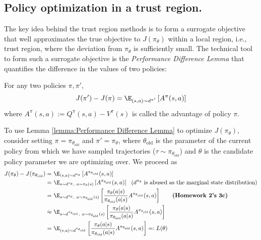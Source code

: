 \subsection{Policy optimization in a trust region.}
The key idea behind the trust region methods is to form a surrogate objective that well approximates the true objective to $J(\pi_\theta)$ within a local region, i.e., trust region, where the deviation from $\pi_\theta$ is sufficiently small.
The technical tool to form such a surrogate objective is the {\em Performance Difference Lemma} that quantifies the difference in the values of two policies:
\begin{lemma}
\label{lemma:Performance Difference Lemma}
For any two policies $\pi, \pi'$,
\begin{align*}
    J(\pi') - J(\pi) = \E_{{(s,a)}\sim d^{\pi'}}\left[A^\pi(s,a)\right]
\end{align*}
where $A^\pi(s,a):= Q^\pi(s,a)-V^\pi(s)$ is called the advantage of policy $\pi$.
\end{lemma}
To use Lemma \ref{lemma:Performance Difference Lemma} to optimize $J(\pi_\theta)$, consider setting $\pi=\pi_{\theta_{\text{old}}}$ and $\pi'=\pi_\theta$,
where $\theta_{\text{old}}$ is the parameter of the current policy from which we have sampled trajectories ($\tau\sim\pi_{\theta_{\text{old}}}$) and $\theta$ is the candidate policy parameter we are optimizing over.
We proceed as 
\begin{align*}
    J(\pi_\theta) - J(\pi_{\theta_{\text{old}}})=&~ \E_{(s,a)\sim d^{\pi_\theta}}\left[A^{\pi_{\theta_{\text{old}}}}(s,a)\right]\\
    =&~\E_{s\sim d^{\pi_\theta},~ a\sim\pi_\theta(s)}\left[A^{\pi_{\theta_{\text{old}}}}(s,a)\right]
    ~~\text{($d^{\pi_\theta}$ is abused as the marginal state distribution)}\\
    =&~\E_{s\sim d^{\pi_\theta},~ a\sim\pi_{\theta_{\text{old}}}(s)}\left[\frac{\pi_\theta(a|s)}{\pi_{\theta_{\text{old}}}(a|s)}A^{\pi_{\theta_{\text{old}}}}(s,a)\right] \qquad\text{\bf(Homework 2's 3c)} \\
    \approx&~\E_{s\sim d^{\pi_{\theta_{\text{old}}}},~ a\sim\pi_{\theta_{\text{old}}}(s)}\left[\frac{\pi_\theta(a|s)}{\pi_{\theta_{\text{old}}}(a|s)}A^{\pi_{\theta_{\text{old}}}}(s,a)\right]\\
    =&~ \E_{(s,a)\sim d^{\pi_{\theta_{\text{old}}}}}\left[\frac{\pi_\theta(a|s)}{\pi_{\theta_{\text{old}}}(a|s)}A^{\pi_{\theta_{\text{old}}}}(s,a)\right] =: L(\theta)
\end{align*}
